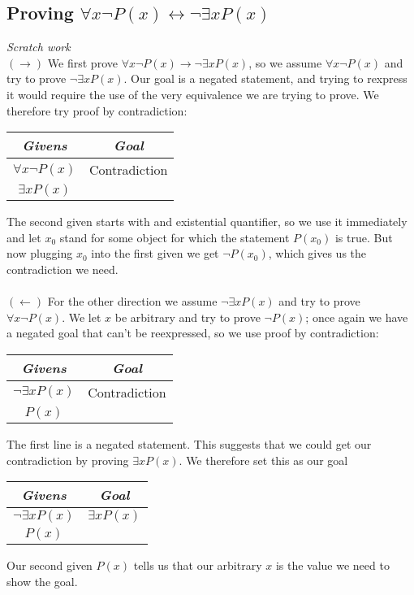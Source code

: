 \documentclass{report}
\theoremstyle{definition}
\begin{document}
\subsection{Proving $\forall x\neg P(x)\leftrightarrow\neg\exists xP(x)$}
\textit{Scratch work}\\
$(\to)$ We first prove $\forall x\neg P(x)\rightarrow\neg\exists xP(x)$, so we assume $\forall x\neg P(x)$ and try to prove $\neg\exists xP(x)$. 
Our goal is a negated statement, and trying to rexpress it would require the use of the very equivalence we are trying to prove. We therefore try proof by contradiction:
\begin{center}
\begin{tabular}{c|c}
\textit{Givens}&\textit{Goal}\\
\hline
$\forall x\neg P(x)$&Contradiction\\
$\exists xP(x)$&
\end{tabular}
\end{center}
The second given starts with and existential quantifier, so we use it immediately and let $x_0$ stand for some object for which the statement $P(x_0)$ is true. But now plugging $x_0$ into 
the first given we get $\neg P(x_0)$, which gives us the contradiction we need.\\
\vspace{1mm}\\
$(\leftarrow)$ For the other direction we assume $\neg\exists xP(x)$ and try to prove $\forall x\neg P(x)$. We let $x$ be arbitrary and try to prove $\neg P(x)$; once again we have a negated goal
that can't be reexpressed, so we use proof by contradiction:
\begin{center}
\begin{tabular}{c|c}
\textit{Givens}&\textit{Goal}\\
\hline
$\neg\exists xP(x)$&Contradiction\\
$P(x)$&
\end{tabular}
\end{center}
The first line is a negated statement. This suggests that we could get our contradiction by proving $\exists xP(x)$. We therefore set this as our goal
\begin{center}
\begin{tabular}{c|c}
\textit{Givens}&\textit{Goal}\\
\hline
$\neg\exists xP(x)$&$\exists xP(x)$\\
$P(x)$&
\end{tabular}
\end{center}
Our second given $P(x)$ tells us that our arbitrary $x$ is the value we need to show the goal.\\
\end{document}

